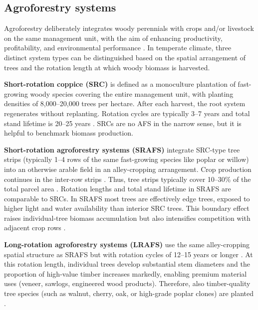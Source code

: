 \documentclass[APA,TimesLARGE]{WileyNJDv5} %
\begin{document}
\subsection{Agroforestry systems}\label{sec:lit-afs}

Agroforestry deliberately integrates woody perennials with crops and/or livestock on the same management unit, with the aim of enhancing productivity, profitability, and environmental performance \cite{Nair1993_IntroAgroforestry,Toensmeier2017_Carbon_Agroforestry}. In temperate climate, three distinct system types can be distinguished based on the spatial arrangement of trees and the rotation length at which woody biomass is harvested.

\textbf{Short-rotation coppice (SRC)} is defined as a monoculture plantation of fast-growing woody species covering the entire management unit, with planting densities of 8,000--20,000 trees per hectare. After each harvest, the root system regenerates without replanting. Rotation cycles
are typically 3--7 years and total stand lifetime is 20--25 years \cite{Trnka2008_Poplar_SRF,Faasch2012_SRC_Economics}. SRCs are no AFS in the narrow sense, but it is helpful to benchmark biomass production.

\textbf{Short-rotation agroforestry systems (SRAFS)} integrate SRC-type tree strips (typically 1--4 rows of the same fast-growing species like poplar or willow) into an otherwise arable field in an alley-cropping arrangement. Crop production continues in the inter-row strips \cite{Huber2018_SRAFS_growth}. Thus, tree strips typically cover 10--30\% of the total parcel area \cite{Graves2007_Agroforestry_Economics}. Rotation lengths and total stand lifetime in SRAFS are comparable to SRCs. In SRAFS most trees are effectively edge trees, exposed to higher light and water availability than interior SRC trees. This boundary effect raises individual-tree biomass accumulation but also intensifies competition with adjacent crop rows \cite{Huber2018_SRAFS_growth}.

\textbf{Long-rotation agroforestry systems (LRAFS)} use the same alley-cropping spatial structure as SRAFS but with rotation cycles of 12--15 years or longer \cite{Graves2007_Agroforestry_Economics,Nair1993_IntroAgroforestry}. At this rotation length, individual trees develop substantial stem diameters and the proportion of high-value timber increases markedly, enabling premium material uses (veneer, sawlogs, engineered wood products). Therefore, also timber-quality tree species (such as walnut, cherry, oak, or high-grade poplar clones) are planted \cite{reisner2007target}.
\end{document}
